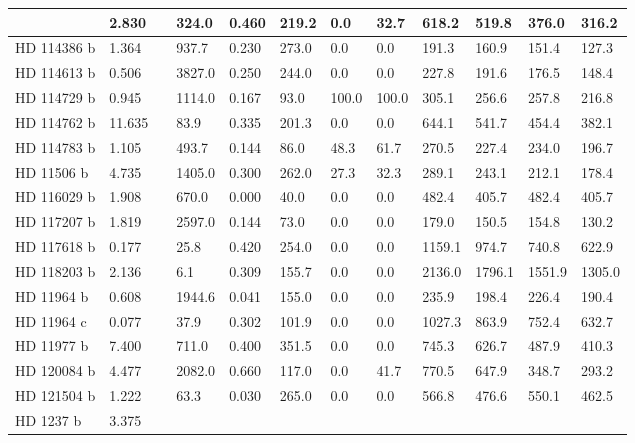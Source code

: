 \documentclass[letterpaper,10pt,english]{sphinxmanual}
\begin{document}
\begin{longtable}{|l|l|l|l|l|l|l|l|l|l|l|l|}
 & 
2.830
 &  & 
324.0
 & 
0.460
 & 
219.2
 & 
0.0
 & 
32.7
 & 
618.2
 & 
519.8
 & 
376.0
 & 
316.2
\\
\hline
HD 114386 b
 & 
1.364
 &  & 
937.7
 & 
0.230
 & 
273.0
 & 
0.0
 & 
0.0
 & 
191.3
 & 
160.9
 & 
151.4
 & 
127.3
\\
\hline
HD 114613 b
 & 
0.506
 &  & 
3827.0
 & 
0.250
 & 
244.0
 & 
0.0
 & 
0.0
 & 
227.8
 & 
191.6
 & 
176.5
 & 
148.4
\\
\hline
HD 114729 b
 & 
0.945
 &  & 
1114.0
 & 
0.167
 & 
93.0
 & 
100.0
 & 
100.0
 & 
305.1
 & 
256.6
 & 
257.8
 & 
216.8
\\
\hline
HD 114762 b
 & 
11.635
 &  & 
83.9
 & 
0.335
 & 
201.3
 & 
0.0
 & 
0.0
 & 
644.1
 & 
541.7
 & 
454.4
 & 
382.1
\\
\hline
HD 114783 b
 & 
1.105
 &  & 
493.7
 & 
0.144
 & 
86.0
 & 
48.3
 & 
61.7
 & 
270.5
 & 
227.4
 & 
234.0
 & 
196.7
\\
\hline
HD 11506 b
 & 
4.735
 &  & 
1405.0
 & 
0.300
 & 
262.0
 & 
27.3
 & 
32.3
 & 
289.1
 & 
243.1
 & 
212.1
 & 
178.4
\\
\hline
HD 116029 b
 & 
1.908
 &  & 
670.0
 & 
0.000
 & 
40.0
 & 
0.0
 & 
0.0
 & 
482.4
 & 
405.7
 & 
482.4
 & 
405.7
\\
\hline
HD 117207 b
 & 
1.819
 &  & 
2597.0
 & 
0.144
 & 
73.0
 & 
0.0
 & 
0.0
 & 
179.0
 & 
150.5
 & 
154.8
 & 
130.2
\\
\hline
HD 117618 b
 & 
0.177
 &  & 
25.8
 & 
0.420
 & 
254.0
 & 
0.0
 & 
0.0
 & 
1159.1
 & 
974.7
 & 
740.8
 & 
622.9
\\
\hline
HD 118203 b
 & 
2.136
 &  & 
6.1
 & 
0.309
 & 
155.7
 & 
0.0
 & 
0.0
 & 
2136.0
 & 
1796.1
 & 
1551.9
 & 
1305.0
\\
\hline
HD 11964 b
 & 
0.608
 &  & 
1944.6
 & 
0.041
 & 
155.0
 & 
0.0
 & 
0.0
 & 
235.9
 & 
198.4
 & 
226.4
 & 
190.4
\\
\hline
HD 11964 c
 & 
0.077
 &  & 
37.9
 & 
0.302
 & 
101.9
 & 
0.0
 & 
0.0
 & 
1027.3
 & 
863.9
 & 
752.4
 & 
632.7
\\
\hline
HD 11977 b
 & 
7.400
 &  & 
711.0
 & 
0.400
 & 
351.5
 & 
0.0
 & 
0.0
 & 
745.3
 & 
626.7
 & 
487.9
 & 
410.3
\\
\hline
HD 120084 b
 & 
4.477
 &  & 
2082.0
 & 
0.660
 & 
117.0
 & 
0.0
 & 
41.7
 & 
770.5
 & 
647.9
 & 
348.7
 & 
293.2
\\
\hline
HD 121504 b
 & 
1.222
 &  & 
63.3
 & 
0.030
 & 
265.0
 & 
0.0
 & 
0.0
 & 
566.8
 & 
476.6
 & 
550.1
 & 
462.5
\\
\hline
HD 1237 b
 & 
3.375
 &  & 

\end{longtable}
\end{document}
